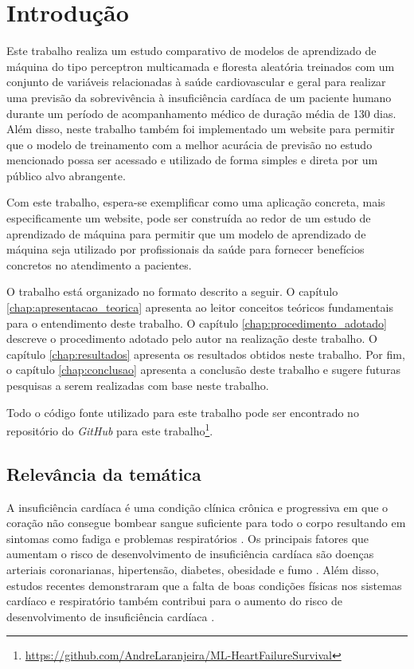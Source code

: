 \chapter{Introdução} \label{chap:introducao}

Este trabalho realiza um estudo comparativo de modelos de aprendizado de máquina do tipo perceptron multicamada e floresta aleatória treinados com um conjunto de variáveis relacionadas à saúde cardiovascular e geral para realizar uma previsão da sobrevivência à insuficiência cardíaca de um paciente humano durante um período de acompanhamento médico de duração média de 130 dias. Além disso, neste trabalho também foi implementado um website para permitir que o modelo de treinamento com a melhor acurácia de previsão no estudo mencionado possa ser acessado e utilizado de forma simples e direta por um público alvo abrangente.

Com este trabalho, espera-se exemplificar como uma aplicação concreta, mais especificamente um website, pode ser construída ao redor de um estudo de aprendizado de máquina para permitir que um modelo de aprendizado de máquina seja utilizado por profissionais da saúde para fornecer benefícios concretos no atendimento a pacientes.

O trabalho está organizado no formato descrito a seguir. O capítulo \ref{chap:apresentacao_teorica} apresenta ao leitor conceitos teóricos fundamentais para o entendimento deste trabalho. O capítulo \ref{chap:procedimento_adotado} descreve o procedimento adotado pelo autor na realização deste trabalho. O capítulo \ref{chap:resultados} apresenta os resultados obtidos neste trabalho. Por fim, o capítulo \ref{chap:conclusao} apresenta a conclusão deste trabalho e sugere futuras pesquisas a serem realizadas com base neste trabalho.

Todo o código fonte utilizado para este trabalho pode ser encontrado no repositório do \textit{GitHub} para este trabalho\footnote{\url{https://github.com/AndreLaranjeira/ML-HeartFailureSurvival}}.

\section{Relevância da temática}

A insuficiência cardíaca é uma condição clínica crônica e progressiva em que o coração não consegue bombear sangue suficiente para todo o corpo resultando em sintomas como fadiga e problemas respiratórios \cite{heart_failure_definition}. Os principais fatores que aumentam o risco de desenvolvimento de insuficiência cardíaca são doenças arteriais coronarianas, hipertensão, diabetes, obesidade e fumo \cite[p.399]{heart_disease2021}. Além disso, estudos recentes demonstraram que a falta de boas condições físicas nos sistemas cardíaco e respiratório também contribui para o aumento do risco de desenvolvimento de insuficiência cardíaca \cite[p.62]{heart_disease2021}.

